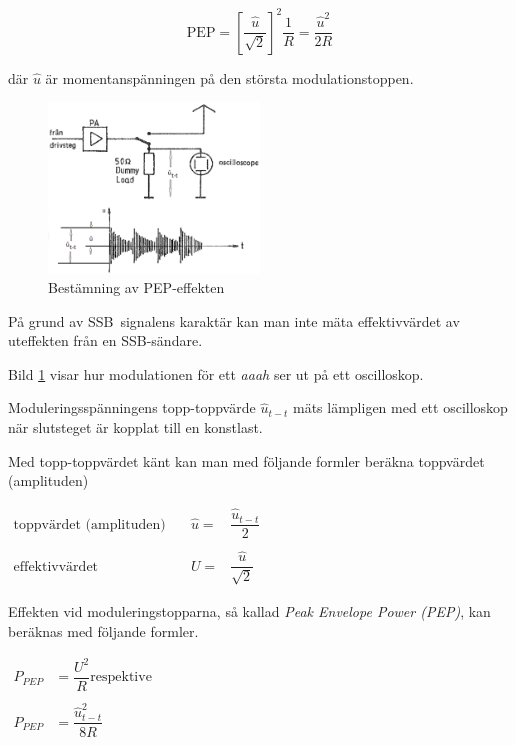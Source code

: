 \begin{equation*}
\mathrm{PEP} = \left[\dfrac{\hat{u}}{\sqrt{2}}\right]^2\frac{1}{R} =  \frac{\hat{u}^2}{2R}
\end{equation*}

där \(\hat{u}\) är momentanspänningen på den största modulationstoppen.

\begin{figure}
	\includegraphics[width=0.5\textwidth]{images/cropped_pdfs/bild_2_3-52.pdf}
	\caption{Bestämning av PEP-effekten}
	\label{fig:BildII3-52}
\end{figure}

På grund av SSB~signalens karaktär kan man inte mäta effektivvärdet av
uteffekten från en SSB-sändare.

Bild \ref{fig:BildII3-52} visar hur modulationen för ett \emph{aaah} ser ut
på ett oscilloskop.

Moduleringsspänningens topp-topp\-värde \(\hat{u}_{t-t}\) mäts lämpligen med ett
oscilloskop när slutsteget är kopplat till en konstlast.

Med topp-toppvärdet känt kan man med följande formler beräkna
toppvärdet (amplituden)

\(
\begin{array}{lll}
\text{toppvärdet (amplituden)} &  \quad \hat{u}= & \dfrac{\hat{u}_{t-t}}{2}\\
& & \\
\text{effektivvärdet} &\quad  U =& \dfrac{\hat{u}}{\sqrt{2}}
\end{array}
\)

Effekten vid moduleringstopparna, så kallad \emph{Peak Envelope Power (PEP)},
kan beräknas med följande formler.

\(
\begin{array}{ll}
P_{PEP} & = \dfrac{U^2}{R} \text{respektive} \\
&\\
P_{PEP} & = \dfrac{\hat{u}_{t-t}^2}{8R}
\end{array}
\)

